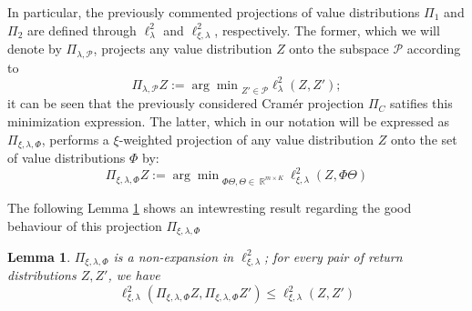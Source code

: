 \documentclass[12pt,a4paper,openright,twoside]{article}
\DeclareMathOperator*{\R}{\mathbb{R}}
\numberwithin{equation}{section}
\newtheorem{lemma}[theorem]{Lemma}
\theoremstyle{definition}
\theoremstyle{remark}
\theoremstyle{plain}
\begin{document}
In particular, the previously commented projections of value distributions $\Pi_1$ and $\Pi_2$ are defined through $\ell_{\lambda}^2$ and $\ell_{\xi,\lambda}^2$, respectively. The former, which we will denote by $\Pi_{\lambda,\mathcal{P}}$, projects any value distribution $Z$ onto the subspace $\mathcal{P}$ according to
\begin{equation}
	\Pi_{\lambda,\mathcal{P}} Z := {\arg \min}_{Z'\in \mathcal{P}} \ell_{\lambda}^2 (Z, Z');
\end{equation} 
it can be seen that the previously considered Cramér projection $\Pi_C$ satifies this minimization expression\cite{DRLlinear}. The latter, which in our notation will be expressed as $\Pi_{\xi,\lambda, \Phi}$, performs a $\xi$-weighted projection of any value distribution $Z$ onto the set of value distributions $\Phi$ by:
\begin{equation}
	\Pi_{\xi,\lambda, \Phi} Z := {\arg \min}_{\Phi\Theta, \Theta \in \R^{m \times K}} \ell_{\xi,\lambda}^2 (Z, \Phi\Theta)
\end{equation} 

The following Lemma \ref{projectionNonexpansion} shows an intewresting result regarding the good behaviour of this projection $\Pi_{\xi,\lambda, \Phi}$
\begin{lemma} \label{projectionNonexpansion}
	$\Pi_{\xi,\lambda, \Phi}$ is a non-expansion in $\ell_{\xi,\lambda}^2$; for every pair of return distributions $Z, Z'$, we have
	\begin{equation*}
		\ell_{\xi,\lambda}^2 (\Pi_{\xi,\lambda, \Phi} Z, \Pi_{\xi,\lambda, \Phi} Z') \leq \ell_{\xi,\lambda}^2(Z,Z')
	\end{equation*}
\end{lemma}
\end{document}
